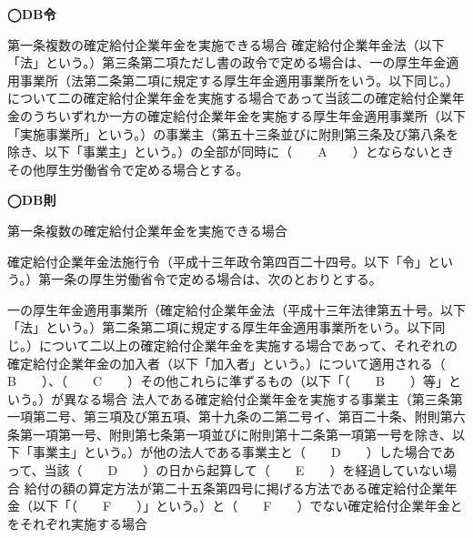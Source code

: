 \begin{fillblank}[自作 2026/10/4]

  \noindent \textbf{◯DB令}
  \begin{lawstructure}
    \begin{lawarticle}{第一条}{複数の確定給付企業年金を実施できる場合}
      確定給付企業年金法（以下「法」という。）第三条第二項ただし書の政令で定める場合は、一の厚生年金適用事業所（法第二条第二項に規定する厚生年金適用事業所をいう。以下同じ。）について二の確定給付企業年金を実施する場合であって当該二の確定給付企業年金のうちいずれか一方の確定給付企業年金を実施する厚生年金適用事業所（以下「実施事業所」という。）の事業主（第五十三条並びに附則第三条及び第八条を除き、以下「事業主」という。）の全部が同時に（　　A　　）とならないときその他厚生労働省令で定める場合とする。
    \end{lawarticle}
  \end{lawstructure}

  \noindent \textbf{◯DB則}
  \begin{lawstructure}
    \begin{lawarticle}{第一条}{複数の確定給付企業年金を実施できる場合}

      確定給付企業年金法施行令（平成十三年政令第四百二十四号。以下「令」という。）第一条の厚生労働省令で定める場合は、次のとおりとする。

      一の厚生年金適用事業所（確定給付企業年金法（平成十三年法律第五十号。以下「法」という。）第二条第二項に規定する厚生年金適用事業所をいう。以下同じ。）について二以上の確定給付企業年金を実施する場合であって、それぞれの確定給付企業年金の加入者（以下「加入者」という。）について適用される（　　B　　）、（　　C　　）その他これらに準ずるもの（以下「（　　B　　）等」という。）が異なる場合
      法人である確定給付企業年金を実施する事業主（第三条第一項第二号、第三項及び第五項、第十九条の二第二号イ、第百二十条、附則第六条第一項第一号、附則第七条第一項並びに附則第十二条第一項第一号を除き、以下「事業主」という。）が他の法人である事業主と（　　D　　）した場合であって、当該（　　D　　）の日から起算して（　　E　　）を経過していない場合
      給付の額の算定方法が第二十五条第四号に掲げる方法である確定給付企業年金（以下「（　　F　　）」という。）と（　　F　　）でない確定給付企業年金とをそれぞれ実施する場合
    \end{lawarticle}
  \end{lawstructure}

\end{fillblank}


